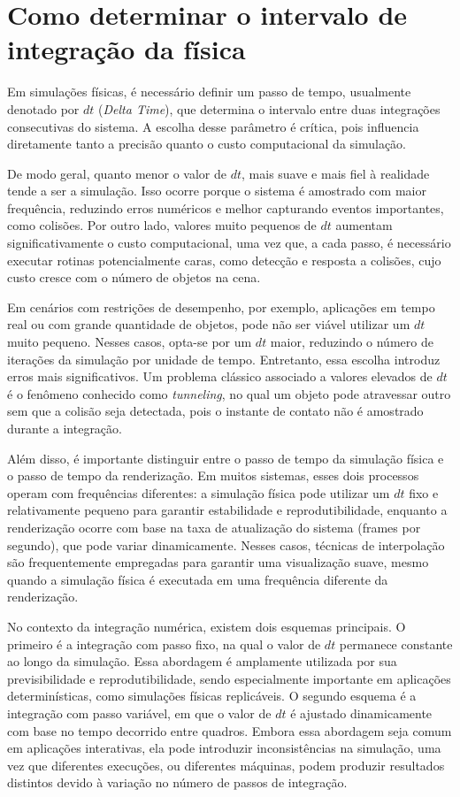 \section{Como determinar o intervalo de integração da física}

Em simulações físicas, é necessário definir um passo de tempo, usualmente denotado por $dt$ (\textit{Delta Time}), que determina o intervalo entre duas integrações consecutivas do sistema. A escolha desse parâmetro é crítica, pois influencia diretamente tanto a precisão quanto o custo computacional da simulação.

De modo geral, quanto menor o valor de $dt$, mais suave e mais fiel à realidade tende a ser a simulação. Isso ocorre porque o sistema é amostrado com maior frequência, reduzindo erros numéricos e melhor capturando eventos importantes, como colisões. Por outro lado, valores muito pequenos de $dt$ aumentam significativamente o custo computacional, uma vez que, a cada passo, é necessário executar rotinas potencialmente caras, como detecção e resposta a colisões, cujo custo cresce com o número de objetos na cena.

Em cenários com restrições de desempenho, por exemplo, aplicações em tempo real ou com grande quantidade de objetos, pode não ser viável utilizar um $dt$ muito pequeno. Nesses casos, opta-se por um $dt$ maior, reduzindo o número de iterações da simulação por unidade de tempo. Entretanto, essa escolha introduz erros mais significativos. Um problema clássico associado a valores elevados de $dt$ é o fenômeno conhecido como \textit{tunneling}, no qual um objeto pode atravessar outro sem que a colisão seja detectada, pois o instante de contato não é amostrado durante a integração.

Além disso, é importante distinguir entre o passo de tempo da simulação física e o passo de tempo da renderização. Em muitos sistemas, esses dois processos operam com frequências diferentes: a simulação física pode utilizar um $dt$ fixo e relativamente pequeno para garantir estabilidade e reprodutibilidade, enquanto a renderização ocorre com base na taxa de atualização do sistema (frames por segundo), que pode variar dinamicamente. Nesses casos, técnicas de interpolação são frequentemente empregadas para garantir uma visualização suave, mesmo quando a simulação física é executada em uma frequência diferente da renderização.

No contexto da integração numérica, existem dois esquemas principais. O primeiro é a integração com passo fixo, na qual o valor de $dt$ permanece constante ao longo da simulação. Essa abordagem é amplamente utilizada por sua previsibilidade e reprodutibilidade, sendo especialmente importante em aplicações determinísticas, como simulações físicas replicáveis. O segundo esquema é a integração com passo variável, em que o valor de $dt$ é ajustado dinamicamente com base no tempo decorrido entre quadros. Embora essa abordagem seja comum em aplicações interativas, ela pode introduzir inconsistências na simulação, uma vez que diferentes execuções, ou diferentes máquinas, podem produzir resultados distintos devido à variação no número de passos de integração.

